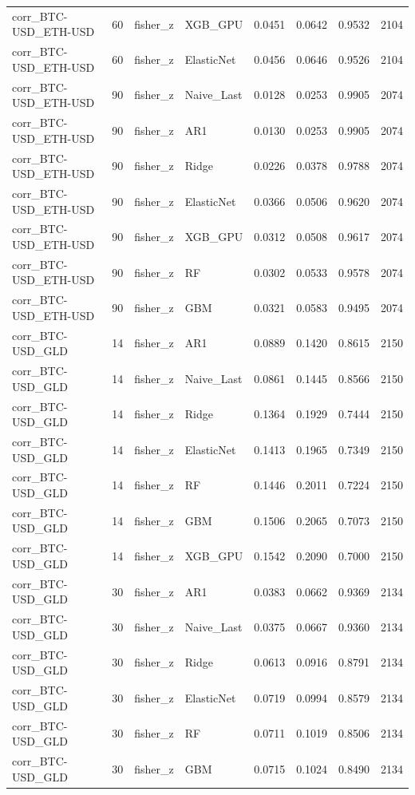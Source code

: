 \begin{table}[H]
\begin{tabular}{llllrrrr}
corr_BTC-USD_ETH-USD & 60 & fisher_z & XGB_GPU & 0.0451 & 0.0642 & 0.9532 & 2104 \\
corr_BTC-USD_ETH-USD & 60 & fisher_z & ElasticNet & 0.0456 & 0.0646 & 0.9526 & 2104 \\
corr_BTC-USD_ETH-USD & 90 & fisher_z & Naive_Last & 0.0128 & 0.0253 & 0.9905 & 2074 \\
corr_BTC-USD_ETH-USD & 90 & fisher_z & AR1 & 0.0130 & 0.0253 & 0.9905 & 2074 \\
corr_BTC-USD_ETH-USD & 90 & fisher_z & Ridge & 0.0226 & 0.0378 & 0.9788 & 2074 \\
corr_BTC-USD_ETH-USD & 90 & fisher_z & ElasticNet & 0.0366 & 0.0506 & 0.9620 & 2074 \\
corr_BTC-USD_ETH-USD & 90 & fisher_z & XGB_GPU & 0.0312 & 0.0508 & 0.9617 & 2074 \\
corr_BTC-USD_ETH-USD & 90 & fisher_z & RF & 0.0302 & 0.0533 & 0.9578 & 2074 \\
corr_BTC-USD_ETH-USD & 90 & fisher_z & GBM & 0.0321 & 0.0583 & 0.9495 & 2074 \\
corr_BTC-USD_GLD & 14 & fisher_z & AR1 & 0.0889 & 0.1420 & 0.8615 & 2150 \\
corr_BTC-USD_GLD & 14 & fisher_z & Naive_Last & 0.0861 & 0.1445 & 0.8566 & 2150 \\
corr_BTC-USD_GLD & 14 & fisher_z & Ridge & 0.1364 & 0.1929 & 0.7444 & 2150 \\
corr_BTC-USD_GLD & 14 & fisher_z & ElasticNet & 0.1413 & 0.1965 & 0.7349 & 2150 \\
corr_BTC-USD_GLD & 14 & fisher_z & RF & 0.1446 & 0.2011 & 0.7224 & 2150 \\
corr_BTC-USD_GLD & 14 & fisher_z & GBM & 0.1506 & 0.2065 & 0.7073 & 2150 \\
corr_BTC-USD_GLD & 14 & fisher_z & XGB_GPU & 0.1542 & 0.2090 & 0.7000 & 2150 \\
corr_BTC-USD_GLD & 30 & fisher_z & AR1 & 0.0383 & 0.0662 & 0.9369 & 2134 \\
corr_BTC-USD_GLD & 30 & fisher_z & Naive_Last & 0.0375 & 0.0667 & 0.9360 & 2134 \\
corr_BTC-USD_GLD & 30 & fisher_z & Ridge & 0.0613 & 0.0916 & 0.8791 & 2134 \\
corr_BTC-USD_GLD & 30 & fisher_z & ElasticNet & 0.0719 & 0.0994 & 0.8579 & 2134 \\
corr_BTC-USD_GLD & 30 & fisher_z & RF & 0.0711 & 0.1019 & 0.8506 & 2134 \\
corr_BTC-USD_GLD & 30 & fisher_z & GBM & 0.0715 & 0.1024 & 0.8490 & 2134 \\

\end{tabular}
\end{table}
